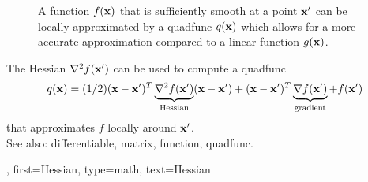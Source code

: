 {{\begin{figure}[H]
\begin{center}
		\vspace*{-5mm}
	\end{center}
	\caption{
		A \gls{function} $f({\bf x})$ that is sufficiently \gls{smooth} at a 
		point ${\bf x}'$ can be locally approximated by 
		a \gls{quadfunc} $q({\bf x})$ which allows for a more accurate approximation 
		compared to a linear \gls{function} $g({\bf x})$. \label{fig_quadapprox_hessian_dict}}
\end{figure}
		The Hessian $\nabla^2 f({\bf x}')$ can be used to compute a \gls{quadfunc} 
		$$q({\bf x}) = (1/2) ({\bf x}- {\bf x}')^{T} \underbrace{\nabla^2 f({\bf x}')}_{\text{Hessian}} 
		({\bf x}- {\bf x}') +  ({\bf x}- {\bf x}')^{T} \underbrace{\nabla f({\bf x}')}_{\text{gradient}} 
		+ f({\bf x}')$$
		that approximates $f$ locally around ${\bf x}'$. 
        		\\
		See also: \gls{differentiable}, \gls{matrix}, \gls{function}, \gls{quadfunc}. }, 
	first={Hessian},
	type=math,
	text={Hessian}
}

